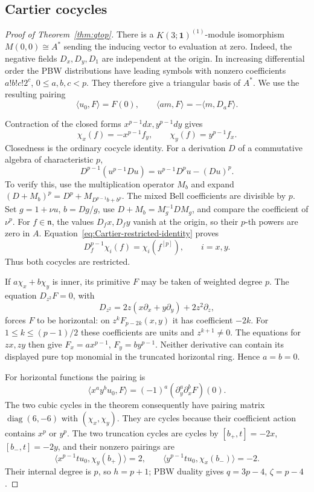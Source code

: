 \documentclass[11pt]{article}
\theoremstyle{plain}
\theoremstyle{definition}
\theoremstyle{remark}
\numberwithin{equation}{section}
\begin{document}
\subsection{Cartier cocycles}\label{sec:terminal-proof}

\begin{proof}[Proof of Theorem~\ref{thm:qtop}]
There is a \(K(3;\mathbf1)^{(1)}\)-module isomorphism
\(M(0,0)\cong A^*\) sending the inducing vector to evaluation at zero.
Indeed, the negative fields \(D_x,D_y,D_1\) are independent at the origin.
In increasing differential order the PBW distributions have leading
symbols with nonzero coefficients \(a!b!c!2^c\), \(0\le a,b,c<p\).
They therefore give a triangular basis of \(A^*\).
We use the resulting pairing
\[
 \langle u_0,F\rangle=F(0),\qquad
 \langle am,F\rangle=-\langle m,D_aF\rangle .
\]

Contraction of the closed forms \(x^{p-1}dx,y^{p-1}dy\) gives
\[
 \chi_x(f)=-x^{p-1}f_y,\qquad
 \chi_y(f)=y^{p-1}f_x.
\]
Closedness is the ordinary cocycle identity.
For a derivation \(D\) of a commutative algebra of characteristic \(p\),
\begin{equation}\label{eq:Cartier-restricted-identity}
 D^{p-1}(u^{p-1}Du)=u^{p-1}D^pu-(Du)^p.
\end{equation}
To verify this, use the multiplication operator \(M_b\) and expand
\((D+M_b)^p=D^p+M_{D^{p-1}b+b^p}\).
The mixed Bell coefficients are divisible by \(p\).
Set \(g=1+\nu u\), \(b=Dg/g\), use
\(D+M_b=M_g^{-1}DM_g\), and compare the coefficient of \(\nu^p\).
For \(f\in\mathfrak n\), the values \(D_fx,D_fy\) vanish at the origin,
so their \(p\)-th powers are zero in \(A\).
Equation~\eqref{eq:Cartier-restricted-identity} proves
\[
 D_f^{p-1}\chi_i(f)=\chi_i(f^{[p]}),\qquad i=x,y.
\]
Thus both cocycles are restricted.

If \(a\chi_x+b\chi_y\) is inner, its primitive \(F\) may be taken of
weighted degree \(p\).
The equation \(D_{z^2}F=0\), with
\[
 D_{z^2}=2z(x\partial_x+y\partial_y)+2z^2\partial_z,
\]
forces \(F\) to be horizontal: on
\(z^kF_{p-2k}(x,y)\) it has coefficient \(-2k\).
For \(1\le k\le(p-1)/2\) these coefficients are units and
\(z^{k+1}\ne0\).
The equations for \(zx,zy\) then give
\(F_x=ax^{p-1}\), \(F_y=by^{p-1}\).
Neither derivative can contain its displayed pure top monomial in the
truncated horizontal ring. Hence \(a=b=0\).

For horizontal functions the pairing is
\[
 \langle x^ay^bu_0,F\rangle
       =(-1)^a(\partial_y^a\partial_x^bF)(0).
\]
The two cubic cycles in the theorem consequently have pairing matrix
\(\operatorname{diag}(6,-6)\) with \((\chi_x,\chi_y)\).
They are cycles because their coefficient action contains \(x^p\) or \(y^p\).
The two truncation cycles are cycles by
\([b_+,t]=-2x\), \([b_-,t]=-2y\), and their nonzero pairings are
\[
 \langle x^{p-1}tu_0,\chi_y(b_+)\rangle=2,\qquad
 \langle y^{p-1}tu_0,\chi_x(b_-)\rangle=-2 .
\]
Their internal degree is \(p\), so \(h=p+1\);
PBW duality gives \(q=3p-4\), \(\zeta=p-4\).


\end{proof}
\end{document}
